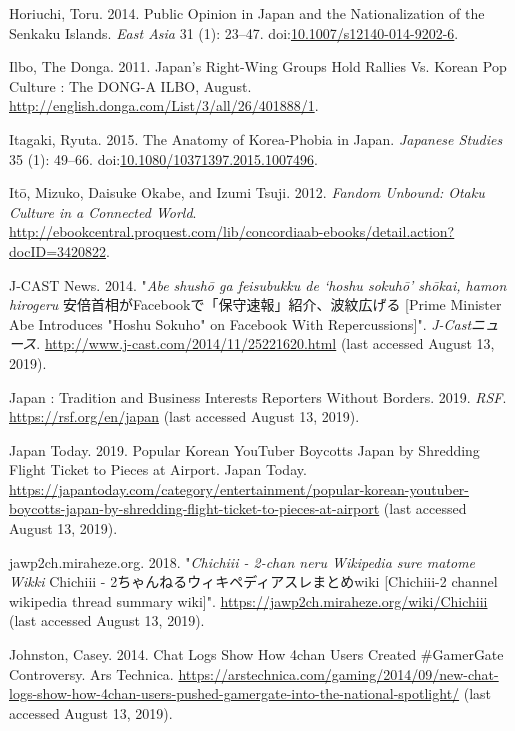 \documentclass[10pt,british,A4paper,twoside]{memoir}
\begin{document}
\hypertarget{ref-horiuchi_public_2014}{}
Horiuchi, Toru. 2014. Public Opinion in Japan and the Nationalization of
the Senkaku Islands. \emph{East Asia} 31 (1): 23--47.
doi:\href{https://doi.org/10.1007/s12140-014-9202-6}{10.1007/s12140-014-9202-6}.

\hypertarget{ref-the_donga_ilbo_japans_2011}{}
Ilbo, The Donga. 2011. Japan's Right-Wing Groups Hold Rallies Vs. Korean
Pop Culture : The DONG-A ILBO, August.
\url{http://english.donga.com/List/3/all/26/401888/1}.

\hypertarget{ref-itagaki_anatomy_2015}{}
Itagaki, Ryuta. 2015. The Anatomy of Korea-Phobia in Japan.
\emph{Japanese Studies} 35 (1): 49--66.
doi:\href{https://doi.org/10.1080/10371397.2015.1007496}{10.1080/10371397.2015.1007496}.

\hypertarget{ref-ito_fandom_2012}{}
Itō, Mizuko, Daisuke Okabe, and Izumi Tsuji. 2012. \emph{Fandom Unbound:
Otaku Culture in a Connected World}.
\url{http://ebookcentral.proquest.com/lib/concordiaab-ebooks/detail.action?docID=3420822}.

\hypertarget{ref-j-cast_news_eng:_2014}{}
J-CAST News. 2014. "\emph{Abe shushō ga feisubukku de `hoshu sokuhō' shōkai, hamon hirogeru} 安倍首相がFacebookで「保守速報」紹介、波紋広げる [Prime Minister Abe Introduces "Hoshu Sokuho" on Facebook With Repercussions]". \emph{J-Castニュース}.
\url{http://www.j-cast.com/2014/11/25221620.html} (last accessed August 13, 2019).

\hypertarget{ref-noauthor_japan_2019}{}
Japan : Tradition and Business Interests Reporters Without Borders.
2019. \emph{RSF}. \url{https://rsf.org/en/japan} (last accessed August 13, 2019).

\hypertarget{ref-japan_today_popular_2019}{}
Japan Today. 2019. Popular Korean YouTuber Boycotts Japan by Shredding
Flight Ticket to Pieces at Airport. Japan Today.
\url{https://japantoday.com/category/entertainment/popular-korean-youtuber-boycotts-japan-by-shredding-flight-ticket-to-pieces-at-airport} (last accessed August 13, 2019).

\hypertarget{ref-anonymous_chichiii_2018}{}
jawp2ch.miraheze.org. 2018. "\emph{Chichiii - 2-chan neru Wikipedia sure matome Wikki} Chichiii - 2ちゃんねるウィキペディアスレまとめwiki [Chichiii-2 channel wikipedia thread summary wiki]".
\url{https://jawp2ch.miraheze.org/wiki/Chichiii} (last accessed August 13, 2019).

\hypertarget{ref-johnston_chat_2014}{}
Johnston, Casey. 2014. Chat Logs Show How 4chan Users Created
\#GamerGate Controversy. Ars Technica.
\url{https://arstechnica.com/gaming/2014/09/new-chat-logs-show-how-4chan-users-pushed-gamergate-into-the-national-spotlight/} (last accessed August 13, 2019).
\end{document}
